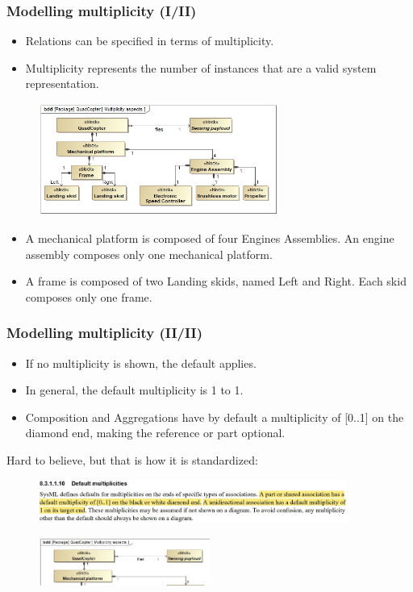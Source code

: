 \documentclass[xcolor=dvipsnames,t]{beamer}
\begin{document}
\begin{frame}
\frametitle{Modelling multiplicity (I/II)}
\begin{itemize}
\item Relations can be specified in terms of multiplicity.
\item Multiplicity represents the number of instances that are a valid system representation.
\end{itemize}

\begin{figure}
 	\includegraphics[width=0.7\textwidth]{QuadMultiplicity.jpg}
\end{figure}

\begin{itemize}
\item A mechanical platform is composed of four Engines Assemblies. An engine assembly composes only one mechanical platform.
\item A frame is composed of two Landing skids, named Left and Right. Each skid composes only one frame.
\end{itemize}

\end{frame}

\begin{frame}
\frametitle{Modelling multiplicity (II/II)}
\begin{itemize}
\item If no multiplicity is shown, the default applies.
\item In general, the default multiplicity is 1 to 1.
\item Composition and Aggregations have by default a multiplicity of [0..1] on the diamond end, making the reference or part optional.
\end{itemize}


Hard to believe, but that is how it is standardized:
\begin{figure}
 	\includegraphics[width=0.9\textwidth]{MultiplicitiesStd.jpg}
\end{figure}

\begin{figure}
 	\includegraphics[width=0.5\textwidth]{QuadMultiplicityFocused.jpg}
\end{figure}

\end{frame}
\end{document}
